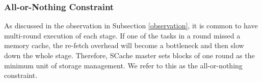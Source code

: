 \subsubsection{All-or-Nothing Constraint}
{\color{black}
As discussed in the observation in Subsection \ref{observation}, it is common to have multi-round execution of each stage. 
If one of the tasks in a round missed a memory cache, the re-fetch overhead will become a bottleneck and then slow down the whole stage. 
}
Therefore, SCache master sets blocks of one round as the minimum unit of storage management.
We refer to this as the all-or-nothing constraint.

